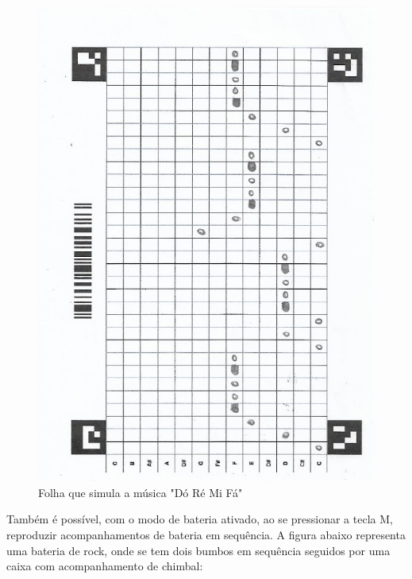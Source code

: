 \documentclass[12pt]{report}
\begin{document}
\begin{figure}[H]
  \centering
  \includegraphics[angle=270,origin=c,width=1\textwidth]{imagens/doremifa.jpeg}
  \caption{Folha que simula a música "Dó Ré Mi Fá"}
  \label{fig:doremifa}
\end{figure}

Também é possível, com o modo de bateria ativado, ao se pressionar a
tecla M, reproduzir acompanhamentos de bateria em sequência. A figura
abaixo representa uma bateria de rock, onde se tem dois bumbos em
sequência seguidos por uma caixa com acompanhamento de chimbal:
\end{document}
